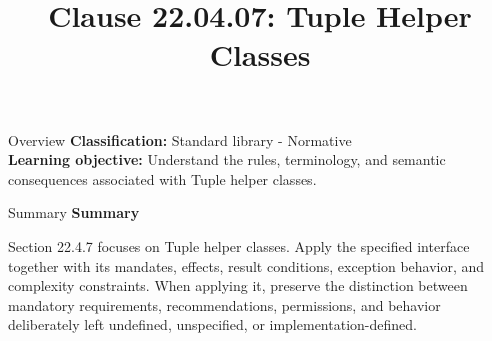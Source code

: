 \documentclass[10pt,letterpaper]{article}
\title{Clause 22.04.07: Tuple Helper Classes}
\author{}
\date{}
\begin{document}
\maketitle
\begin{CornellOverviewBox}{Overview}
\textbf{Classification:} Standard library - Normative\\[2pt]
\textbf{Learning objective:} Understand the rules, terminology, and semantic consequences associated with Tuple helper classes.
\end{CornellOverviewBox}\begin{CornellSummaryBox}{Summary}
{\sffamily\bfseries\color{Accent} Summary}\par\vspace{3pt}Section 22.4.7 focuses on Tuple helper classes. Apply the specified interface together with its mandates, effects, result conditions, exception behavior, and complexity constraints. When applying it, preserve the distinction between mandatory requirements, recommendations, permissions, and behavior deliberately left undefined, unspecified, or implementation-defined.
\end{CornellSummaryBox}
\end{document}
